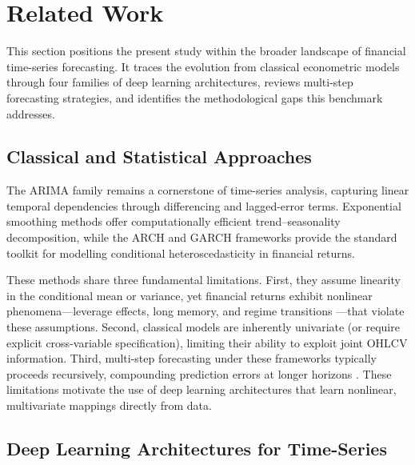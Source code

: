 \section{Related Work}
\label{sec:literature_review}

This section positions the present study within the broader landscape of financial time-series forecasting.  It traces the evolution from classical econometric models through four families of deep learning architectures, reviews multi-step forecasting strategies, and identifies the methodological gaps this benchmark addresses.

\subsection{Classical and Statistical Approaches}
\label{sec:classical_forecasting}

The ARIMA family \citep{Box1970} remains a cornerstone of time-series analysis, capturing linear temporal dependencies through differencing and lagged-error terms.  Exponential smoothing methods \citep{Hyndman2008} offer computationally efficient trend--seasonality decomposition, while the ARCH \citep{Engle1982} and GARCH \citep{Bollerslev1986} frameworks provide the standard toolkit for modelling conditional heteroscedasticity in financial returns.

These methods share three fundamental limitations.  First, they assume linearity in the conditional mean or variance, yet financial returns exhibit nonlinear phenomena---leverage effects, long memory, and regime transitions \citep{Cont2001}---that violate these assumptions.  Second, classical models are inherently univariate (or require explicit cross-variable specification), limiting their ability to exploit joint OHLCV information.  Third, multi-step forecasting under these frameworks typically proceeds recursively, compounding prediction errors at longer horizons \citep{Taieb2012}.  These limitations motivate the use of deep learning architectures that learn nonlinear, multivariate mappings directly from data.

\subsection{Deep Learning Architectures for Time-Series}
\label{sec:dl_time_series}

